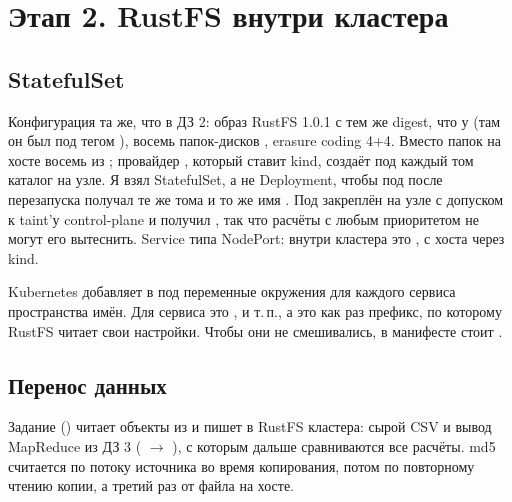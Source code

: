 \section{Этап 2. RustFS внутри кластера}\label{sec:storage}

\subsection{StatefulSet}
Конфигурация та же, что в ДЗ 2: образ RustFS 1.0.1 с тем же digest, что у  (там он был под тегом ), восемь папок-дисков , erasure coding 4+4. Вместо папок на хосте восемь  из ; провайдер , который ставит kind, создаёт под каждый том каталог на узле. Я взял StatefulSet, а не Deployment, чтобы под после перезапуска получал те же тома и то же имя . Под закреплён на узле  с допуском к taint'у control-plane и получил , так что расчёты с любым приоритетом не могут его вытеснить. Service  типа NodePort: внутри кластера это , с хоста  через  kind.


Kubernetes добавляет в под переменные окружения для каждого сервиса пространства имён. Для сервиса  это ,  и т.\,п., а это как раз префикс, по которому RustFS читает свои настройки. Чтобы они не смешивались, в манифесте стоит .

\subsection{Перенос данных}
Задание  () читает объекты из  и пишет в RustFS кластера: сырой CSV и вывод MapReduce из ДЗ 3 ( $\to$ ), с которым дальше сравниваются все расчёты. md5 считается по потоку источника во время копирования, потом по повторному чтению копии, а третий раз от файла на хосте.


